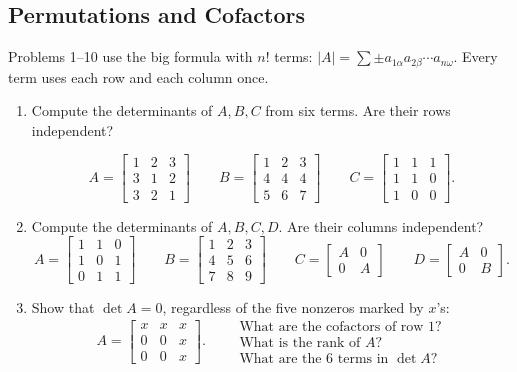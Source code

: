 \documentclass[14pt, a4paper]{article}
\begin{document}
\subsection{Permutations and Cofactors }
\noindent Problems 1--10 use the big formula with $n!$ terms: $|A| = \sum \pm a_{1\alpha}a_{2\beta}\cdots a_{n\omega}$.
\noindent Every term uses each row and each column once.
\begin{enumerate}
    \item Compute the determinants of $A, B, C$ from six terms. Are their rows independent?

          \[
              A = \begin{bmatrix} 1 & 2 & 3 \\ 3 & 1 & 2 \\ 3 & 2 & 1 \end{bmatrix} \qquad
              B = \begin{bmatrix} 1 & 2 & 3 \\ 4 & 4 & 4 \\ 5 & 6 & 7 \end{bmatrix} \qquad
              C = \begin{bmatrix} 1 & 1 & 1 \\ 1 & 1 & 0 \\ 1 & 0 & 0 \end{bmatrix}.
          \]

    \item Compute the determinants of $A, B, C, D$. Are their columns independent?
          \[
              A = \begin{bmatrix} 1 & 1 & 0 \\ 1 & 0 & 1 \\ 0 & 1 & 1 \end{bmatrix} \qquad
              B = \begin{bmatrix} 1 & 2 & 3 \\ 4 & 5 & 6 \\ 7 & 8 & 9 \end{bmatrix} \qquad
              C = \begin{bmatrix} A & 0 \\ 0 & A \end{bmatrix} \qquad
              D = \begin{bmatrix} A & 0 \\ 0 & B \end{bmatrix}.
          \]

    \item Show that $\det A = 0$, regardless of the five nonzeros marked by $x$'s:
          \[
              A = \begin{bmatrix} x & x & x \\ 0 & 0 & x \\ 0 & 0 & x \end{bmatrix} . \qquad
              \begin{array}{l}
                  \text{What are the cofactors of row 1?} \\
                  \text{What is the rank of } A?          \\
                  \text{What are the 6 terms in } \det A?
              \end{array}
          \]


\end{enumerate}
\end{document}
